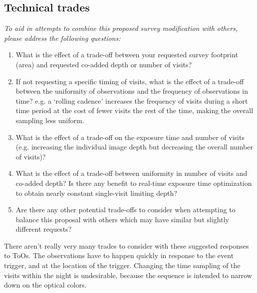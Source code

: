 \documentclass[11pt]{article}
\begin{document}
\subsection{Technical trades}
\begin{footnotesize}
{\it To aid in attempts to combine this proposed survey modification with others, please address the following questions:
\begin{enumerate}
    \item What is the effect of a trade-off between your requested survey footprint (area) and requested co-added depth or number of visits?
    \item If not requesting a specific timing of visits, what is the effect of a trade-off between the uniformity of observations and the frequency of observations in time? e.g. a `rolling cadence' increases the frequency of visits during a short time period at the cost of fewer visits the rest of the time, making the overall sampling less uniform.
    \item What is the effect of a trade-off on the exposure time and number of visits (e.g. increasing the individual image depth but decreasing the overall number of visits)?
    \item What is the effect of a trade-off between uniformity in number of visits and co-added depth? Is there any benefit to real-time exposure time optimization to obtain nearly constant single-visit limiting depth?
    \item Are there any other potential trade-offs to consider when attempting to balance this proposal with others which may have similar but slightly different requests?
\end{enumerate}}
\end{footnotesize}

There aren't really very many trades to consider with these suggested responses to ToOs. The observations have to happen quickly in response to the event trigger, and
at the location of the trigger. Changing the time sampling of the visits within the night is undesirable, because the sequence is intended to narrow down on the optical
colors. 
\end{document}
